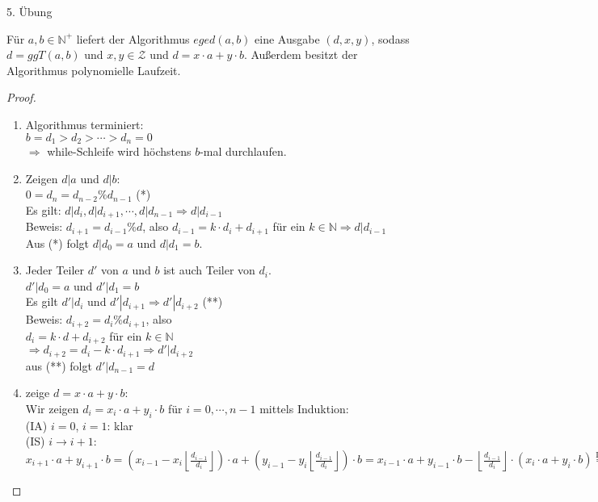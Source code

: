 \begin{section}{5. Übung}
 \begin{satz}
  Für $a,b \in \mathbb{N}^+$ liefert der Algorithmus $eged(a,b)$ eine Ausgabe $(d,x,y)$, sodass $d = ggT(a,b)$ und $x,y \in \mathcal{Z}$ und $d=x\cdot a + y\cdot b$. Außerdem besitzt der Algorithmus polynomielle Laufzeit.
 \end{satz}
 \begin{proof}
  \begin{enumerate}
   \item Algorithmus terminiert:\\
   $b = d_1 > d_2 > \cdots > d_n = 0$\\
   $\Rightarrow$ while-Schleife wird höchstens $b$-mal durchlaufen.
   \item Zeigen $d|a$ und $d|b$:\\
   $0 = d_n = d_{n-2} \% d_{n-1}$ (*)\\
   Es gilt: $d|d_i, d|d_{i+1}, \cdots , d|d_{n-1} \Rightarrow d|d_{i-1}$\\
   Beweis: $d_{i+1} = d_{i-1} \% d$, also $d_{i-1} = k\cdot d_i + d_{i+1}$ für ein $k \in \mathbb{N} \Rightarrow d|d_{i-1}$\\
   Aus (*) folgt $d|d_0 = a$ und $d|d_1 = b$.
   \item Jeder Teiler $d'$ von $a$ und $b$ ist auch Teiler von $d_i$.\\
   $d'|d_0 = a$ und $d'|d_1 = b$\\
   Es gilt $d'|d_i$ und $d'|d_{i+1} \Rightarrow d'|d_{i+2}$ (**)\\
   Beweis: $d_{i+2} = d_i \% d_{i+1}$, also \\
   $d_i = k \cdot d + d_{i+2}$ für ein $k \in \mathbb{N}$\\
   $\Rightarrow d_{i+2} = d_i -k\cdot d_{i+1} \Rightarrow d'|d_{i+2}$\\
   aus (**) folgt $d'|d_{n-1} = d$
   \item zeige $d=x\cdot a + y \cdot b$:\\
   Wir zeigen $d_i =x_i \cdot a + y_i \cdot b$ für $i = 0,\cdots,n-1$ mittels Induktion:\\
   (IA) $i=0$, $i=1$: klar \checkmark\\
   (IS) $i \rightarrow i+1$: $x_{i+1}\cdot a + y_{i+1} \cdot b = (x_{i-1} - x_i \left\lfloor \frac{d_{i-1}}{d_i} \right\rfloor)\cdot a +(y_{i-1} - y_i \left\lfloor \frac{d_{i-1}}{d_i} \right\rfloor)\cdot b = x_{i-1} \cdot a + y_{i-1} \cdot b - \left\lfloor \frac{d_{i-1}}{d_i} \right\rfloor \cdot (x_i\cdot a + y_i \cdot b) \overset{\text{IV}}{=} d_{i-1} - \left\lfloor \frac{d_{i-1}}{d_i} \right\rfloor \cdot d_i = d_{i-1} \% d_i = d_{i+1}$\\

\end{enumerate}
\end{proof}
\end{section}
